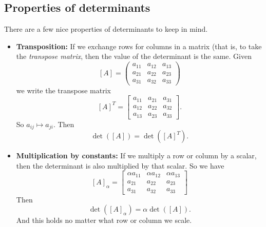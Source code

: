         \subsection{Properties of determinants}
        There are a few nice properties of determinants to keep in mind. 
        \begin{itemize}
            \item \textbf{Transposition:} If we exchange rows for columns in a matrix (that is, to take the \emph{transpose matrix}, then the value of the determinant is the same. Given
            \[
            [A]=\begin{pmatrix}
            a_{11} & a_{12} & a_{13}\\
            a_{21} & a_{22} & a_{23}\\
            a_{31} & a_{32} & a_{33}
            \end{pmatrix}
            \]
            we write the transpose matrix
            \[
            [A]^T=\begin{bmatrix}
            a_{11} & a_{21} & a_{31}\\
            a_{12} & a_{22} & a_{32}\\
            a_{13} & a_{23} & a_{33}
            \end{bmatrix}.
            \]
            So $a_{ij}\mapsto a_{ji}$. Then
            \[
            \det([A])=\det([A]^T).
            \]
            
            \item \textbf{Multiplication by constants:} If we multiply a row or column by a scalar, then the determinant is also multiplied by that scalar.  So we have
            \[
            [A]_\alpha=\begin{bmatrix}
            \alpha a_{11} & \alpha a_{12} & \alpha a_{13}\\
            a_{21} & a_{22} & a_{23}\\
            a_{31} & a_{32} & a_{33}
            \end{bmatrix}
            \]
            Then
            \[
            \det([A]_\alpha)=\alpha \det([A]).
            \]
            And this holds no matter what row or column we scale.
            

\end{itemize}

